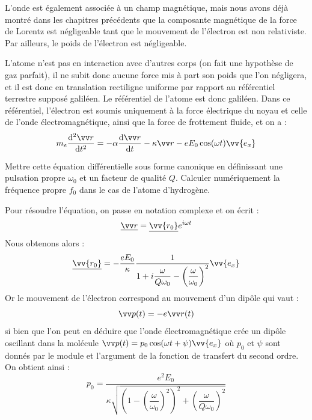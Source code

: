 \documentclass[11pt,fleqn]{book} %
\newcommand{\dd}{\mathrm{d}}
\begin{document}
L'onde est également associée à un champ magnétique, mais nous avons déjà montré dans les chapitres précédents que la composante magnétique de la force de Lorentz est négligeable tant que le mouvement de l'électron est non relativiste. Par ailleurs, le poids de l'électron est négligeable.

L'atome n'est pas en interaction avec d'autres corps (on fait une hypothèse de gaz parfait), il ne subit donc aucune force mis à part son poids que l'on négligera, et il est donc en translation rectiligne uniforme par rapport au référentiel terrestre supposé galiléen. Le référentiel de l'atome est donc galiléen. Dans ce référentiel, l'électron est soumis uniquement à la force électrique du noyau et celle de l'onde électromagnétique, ainsi que la force de frottement fluide, et on a :
\begin{equation}
	m_e \frac{\dd^2 \vv r}{\dd t^2} = - \alpha \frac{\dd \vv r}{\dd t} - \kappa \vv r - e E_0 \cos(\omega t) \vv{e_x}  
\end{equation}

\begin{capex}
	Mettre cette équation différentielle sous forme canonique en définissant une pulsation propre $\omega_0$ et un facteur de qualité $Q$. Calculer numériquement la fréquence propre $f_0$ dans le cas de l'atome d'hydrogène.
\end{capex}

Pour résoudre l'équation, on passe en notation complexe et on écrit :
\begin{equation}
	\underline{\vv r}  = \underline{\vv{r_0}} e^{i \omega t}
\end{equation}
Nous obtenons alors :
\begin{equation}
	\underline{\vv{r_0}} = - \dfrac{e E_0}{\kappa} \frac{1}{1 + i \dfrac{\omega}{Q \omega_0} - \left(\dfrac{\omega}{\omega_0}\right)^2} \vv{e_x}
\end{equation}
Or le mouvement de l'électron correspond au mouvement d'un dipôle qui vaut :
\begin{equation}
	\vv p(t) = -e \vv r(t)
\end{equation}
si bien que l'on peut en déduire que l'onde électromagnétique crée un dipôle oscillant dans la molécule $\vv p(t) = p_0 \cos(\omega t + \psi) \vv{e_x}$ où $p_0$ et $\psi$ sont donnés par le module et l'argument de la fonction de transfert du second ordre. On obtient ainsi :
\begin{equation}
	p_0 = \frac{e^2 E_0}{\kappa \sqrt{ \left(1 - \left(\dfrac{\omega}{\omega_0}\right)^2 \right)^2 + \left(\dfrac{\omega}{Q \omega_0}\right)^2  }}
\end{equation}
\end{document}
